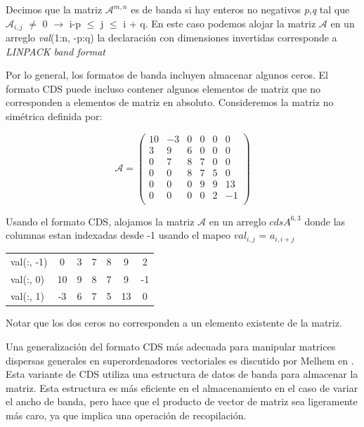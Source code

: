 \documentclass[a4paper,openright,12pt, oneside]{book}
\newcommand{\implica}{\rightarrow}
\begin{document}
Decimos que la matriz $\mathcal{A}^{m,n}$ es de banda si hay enteros no negativos \textit{p},\textit{q} tal que $\mathcal{A}_{i,j}$ $\neq$ 0 $\implica$ i-p $\leq$ j $\leq$ i + q. En este caso podemos alojar la matriz $\mathcal{A}$ en un arreglo \textit{val}(1:n, -p:q) la declaraci\'on con dimensiones invertidas corresponde a \textit{LINPACK band format} \cite{LINPACK}

Por lo general, los formatos de banda incluyen almacenar algunos ceros. El formato CDS puede incluso contener algunos elementos de matriz que no corresponden a elementos de matriz en absoluto. Consideremos la matriz no sim\'etrica definida por:

\begin{equation}
\mathcal{A} =
\left(
\begin{array}{cccccc}
 
10& -3& 0& 0& 0& 0\\
3&   9& 6& 0& 0& 0 \\
0&   7& 8& 7& 0& 0 \\
0&   0& 8& 7& 5& 0 \\
0&   0& 0& 9& 9& 13 \\
0&   0& 0& 0& 2& -1 \\
\end{array}
\right)
\end{equation}

Usando el formato CDS, alojamos la matriz $\mathcal{A}$ en un arreglo \textit{$cdsA^{6, 3}$} donde las columnas estan indexadas desde -1 usando el mapeo $val_{i, j}$ = $a_{i, i+j}$

\begin{tabular}{ l || c | c | c | c | c | c}
  val(:, -1) & 0 & 3 & 7 & 8 & 9 & 2 \\
  val(:, 0) & 10 & 9 & 8 & 7 & 9 & -1 \\
  val(:, 1) & -3 & 6 & 7 & 5 & 13 & 0 \\
\end{tabular}

Notar que los dos ceros no corresponden a un elemento existente de la matriz.

Una generalizaci\'on del formato CDS m\'as adecuada para manipular matrices dispersas generales en superordenadores vectoriales es discutido por Melhem en \cite{MELHEM}. Esta variante de CDS utiliza una estructura de datos de banda para almacenar la matriz. Esta estructura es m\'as eficiente en el almacenamiento en el caso de variar el ancho de banda, pero hace que el producto de vector de matriz sea ligeramente m\'as caro, ya que implica una operaci\'on de recopilaci\'on.
\end{document}
